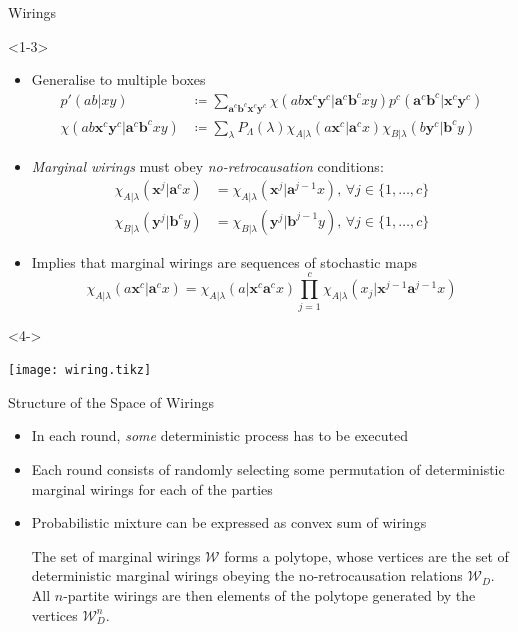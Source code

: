 \documentclass[xcolor=dvipsnames]{beamer}
\newcommand{\dintv}[2]{\mathopen\{#1,\ldots,#2\mathclose\}}
\newcommand{\?}{\mathrel{?}} %
\newcommand{\cvec}[1]{\boldsymbol{\mathbf{#1}}}    %
\newcommand{\sW}{\mathcal{W}}
\begin{document}
\begin{frame}{Wirings}
  \begin{onlyenv}<1-3>
    \begin{itemize}[<+->]
      \item Generalise to multiple boxes
        \begin{align*}
          p'(ab|xy) &\coloneqq \sum_{\cvec{a}^c\cvec{b}^c\cvec{x}^c\cvec{y}^c} \chi(ab\cvec{x}^c\cvec{y}^c|\cvec{a}^c\cvec{b}^cxy) p^c(\cvec{a}^c\cvec{b}^c|\cvec{x}^c\cvec{y}^c)\label{eqn:jwirdistdef} \\
          \chi(ab\cvec{x}^c\cvec{y}^c|\cvec{a}^c\cvec{b}^cxy) &\coloneqq \sum_{\lambda} P_{\Lambda}(\lambda) \chi_{A|\lambda}(a\cvec{x}^c|\cvec{a}^cx) \chi_{B|\lambda}(b\cvec{y}^c|\cvec{b}^cy)
        \end{align*}
      \item \emph{Marginal wirings} must obey \emph{no-retrocausation} conditions:
        \begin{align*}
          \chi_{A|\lambda}(\cvec{x}^j|\cvec{a}^cx) &= \chi_{A|\lambda}(\cvec{x}^j|\cvec{a}^{j-1}x),\,\forall j \in \dintv{1}{c} \\
          \chi_{B|\lambda}(\cvec{y}^j|\cvec{b}^cy) &= \chi_{B|\lambda}(\cvec{y}^j|\cvec{b}^{j-1}y),\,\forall j \in \dintv{1}{c}
        \end{align*}
      \item Implies that marginal wirings are sequences of stochastic maps
        \[ \chi_{A|\lambda}(a\cvec{x}^c|\cvec{a}^cx) = \chi_{A|\lambda}(a|\cvec{x}^c\cvec{a}^{c}x) \prod_{j=1}^c \chi_{A|\lambda}(x_j|\cvec{x}^{j-1}\cvec{a}^{j-1}x) \]
    \end{itemize}
  \end{onlyenv}
  \begin{onlyenv}<4->
    \begin{center}
      \texttt{[image: wiring.tikz]}
    \end{center}
  \end{onlyenv}
\end{frame}

\begin{frame}{Structure of the Space of Wirings}
  \begin{itemize}[<+->]
    \item In each round, \emph{some} deterministic process has to be executed
    \item Each round consists of randomly selecting some permutation of deterministic marginal wirings for each of the parties
    \item Probabilistic mixture can be expressed as convex sum of wirings
      \begin{theorem}
        The set of marginal wirings \(\sW\) forms a polytope, whose vertices are the set of deterministic marginal wirings obeying the no-retrocausation relations \(\sW_D\). All \(n\)-partite wirings are then elements of the polytope generated by the vertices \(\sW_D^n\).
      \end{theorem}
  \end{itemize}
\end{frame}
\end{document}
